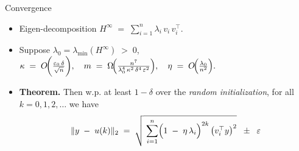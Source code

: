 \documentclass[serif, aspectratio=169]{beamer}
\begin{document}

\begin{frame}{Convergence}
	\begin{itemize}
		
		\item Eigen-decomposition $H^\infty\;=\; \sum_{i=1}^n \lambda_i\,v_i\,v_i^\top$.
		
		
		\item Suppose $\lambda_0 = \lambda_{\min}(H^\infty) \;>\; 0$, 
		\(
		\kappa \;=\; O\!\biggl(\frac{\varepsilon_0\,\delta}{\sqrt{n}}\biggr),
		\quad
		m \;=\; \Omega\!\Bigl(\frac{n^7}{\lambda_0^4\,\kappa^2\,\delta^4\,\varepsilon^2}\Bigr),
		\quad
		\eta \;=\; O\!\Bigl(\frac{\lambda_0}{n^2}\Bigr).
		\)
		\item \textbf{Theorem.} Then w.p. at least $1 - \delta$ over the \textit{random initialization}, 
		for all $k = 0,1,2,\dots$ we have
		\[
		\|y \;-\; u(k)\|_2 
		\;=\;
		\sqrt{\;\sum_{i=1}^n \Bigl(1 \;-\; \eta\,\lambda_i\Bigr)^{2k}\,\bigl(v_i^\top y\bigr)^2}
		\;\;\pm\;\;\varepsilon
		\]
		
		
		
		
	\end{itemize}
	
\end{frame}


%

\end{document}
